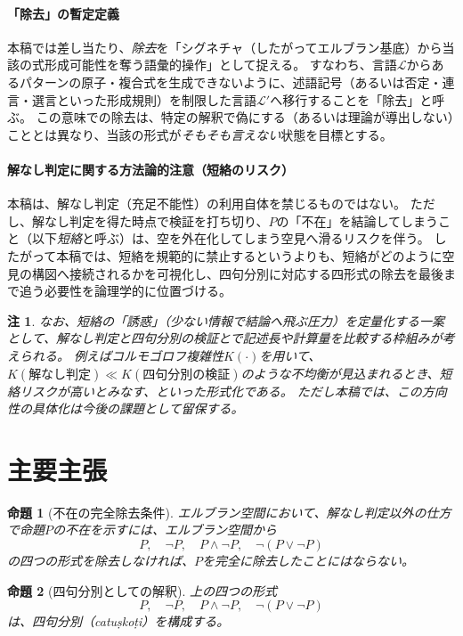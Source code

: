\documentclass[a4paper,11pt]{article}
\newtheorem{proposition}{命題}
\newtheorem{remark}{注}
\begin{document}
\paragraph{「除去」の暫定定義}
本稿では差し当たり、\emph{除去}を「シグネチャ（したがってエルブラン基底）から当該の式形成可能性を奪う語彙的操作」として捉える。
すなわち、言語$\mathcal{L}$からあるパターンの原子・複合式を生成できないように、述語記号（あるいは否定・連言・選言といった形成規則）を制限した言語$\mathcal{L}'$へ移行することを「除去」と呼ぶ。
この意味での除去は、特定の解釈で偽にする（あるいは理論が導出しない）こととは異なり、当該の形式が\emph{そもそも言えない}状態を目標とする。

\paragraph{解なし判定に関する方法論的注意（短絡のリスク）}
本稿は、解なし判定（充足不能性）の利用自体を禁じるものではない。
ただし、解なし判定を得た時点で検証を打ち切り、$P$の「不在」を結論してしまうこと（以下\emph{短絡}と呼ぶ）は、空を外在化してしまう空見へ滑るリスクを伴う。
したがって本稿では、短絡を規範的に禁止するというよりも、短絡がどのように空見の構図へ接続されるかを可視化し、四句分別に対応する四形式の除去を最後まで追う必要性を論理学的に位置づける。

\begin{remark}
なお、短絡の「誘惑」（少ない情報で結論へ飛ぶ圧力）を定量化する一案として、解なし判定と四句分別の検証とで記述長や計算量を比較する枠組みが考えられる。
例えばコルモゴロフ複雑性$K(\cdot)$を用いて、$K(\text{解なし判定}) \ll K(\text{四句分別の検証})$のような不均衡が見込まれるとき、短絡リスクが高いとみなす、といった形式化である。
ただし本稿では、この方向性の具体化は今後の課題として留保する。
\end{remark}

\section{主要主張}
\begin{proposition}[不在の完全除去条件]
エルブラン空間において、解なし判定以外の仕方で命題$P$の不在を示すには、エルブラン空間から
\[
P,\quad \neg P,\quad P\wedge \neg P,\quad \neg(P\vee \neg P)
\]
の四つの形式を除去しなければ、$P$を完全に除去したことにはならない。
\end{proposition}

\begin{proposition}[四句分別としての解釈]
上の四つの形式
\[
P,\quad \neg P,\quad P\wedge \neg P,\quad \neg(P\vee \neg P)
\]
は、四句分別（catuṣkoṭi）を構成する。
\end{proposition}
\end{document}
